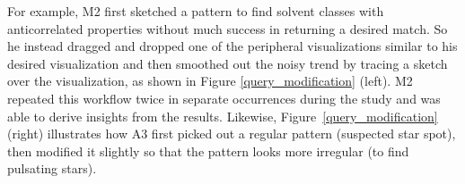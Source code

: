 For example, M2 first sketched a pattern to find solvent classes with anticorrelated properties without much success in returning a desired match.
So he instead dragged and dropped one of the peripheral visualizations similar to his desired visualization and then smoothed out the noisy trend by tracing a sketch over the visualization, as shown in Figure \ref{query_modification} (left). M2 repeated this workflow twice in separate occurrences during the study and was able to derive insights from the results. 
Likewise, Figure~\ref{query_modification} (right) illustrates how A3 first picked out a regular pattern (suspected star spot), then modified it slightly so that the pattern looks more irregular (to find pulsating stars). %
